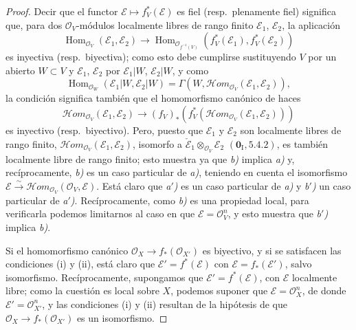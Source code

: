 \begin{proof}
Decir que el functor $\mathscr E\mapsto f_V^*(\mathscr E)$ es fiel
(resp.\ plenamente fiel) significa que, para dos $\mathcal O_V$-módulos localmente
libres de rango finito $\mathscr E_1$, $\mathscr E_2$, la aplicación
\[
  \operatorname{Hom}_{\mathcal O_V}(\mathscr E_1,\mathscr E_2)
  \longrightarrow
  \operatorname{Hom}_{\mathcal O_{f^{-1}(V)}}
  (f_V^*(\mathscr E_1),f_V^*(\mathscr E_2))
\]
es inyectiva (resp.\ biyectiva); como esto debe cumplirse sustituyendo $V$ por un
abierto $W\subset V$ y $\mathscr E_1$, $\mathscr E_2$ por $\mathscr E_1|W$,
$\mathscr E_2|W$, y como
\[
  \operatorname{Hom}_{\mathcal O_W}(\mathscr E_1|W,\mathscr E_2|W)
  =\Gamma(W,\mathscr Hom_{\mathcal O_V}(\mathscr E_1,\mathscr E_2)),
\]
la condición significa también que el homomorfismo canónico de haces
\[
\label{IV.21.13.2.1}
  \mathscr Hom_{\mathcal O_V}(\mathscr E_1,\mathscr E_2)
  \longrightarrow
  (f_V)_*(f_V^*(\mathscr Hom_{\mathcal O_V}(\mathscr E_1,\mathscr E_2)))
  \tag{21.13.2.1}
\]
es inyectivo (resp.\ biyectivo). Pero, puesto que $\mathscr E_1$ y $\mathscr E_2$ son
localmente libres de rango finito,
$\mathscr Hom_{\mathcal O_V}(\mathscr E_1,\mathscr E_2)$, isomorfo a
$\check{\mathscr E}_1\otimes_{\mathcal O_V}\mathscr E_2$
$(\mathbf 0_{\mathrm I}, 5.4.2)$, es también localmente libre de rango finito; esto muestra
ya que \emph{b)} implica \emph{a)} y, recíprocamente, \emph{b)} es un caso particular de \emph{a)},
teniendo en cuenta el isomorfismo
$\mathscr E\xrightarrow{\sim}\mathscr Hom_{\mathcal O_V}(\mathcal O_V,\mathscr E)$.
Está claro que \emph{a$'$)} es un caso particular de \emph{a)} y \emph{b$'$)} un caso particular de
\emph{a$'$)}. Recíprocamente, como \emph{b)} es una propiedad local, para verificarla podemos
limitarnos al caso en que $\mathscr E=\mathcal O_V^n$, y esto muestra que \emph{b$'$)} implica
\emph{b)}.

Si el homomorfismo canónico $\mathcal O_X\to f_*(\mathcal O_{X'})$ es biyectivo,
y si se satisfacen las condiciones (i) y (ii), está claro que
$\mathscr E'=f^*(\mathscr E)$ con $\mathscr E=f_*(\mathscr E')$, salvo isomorfismo.
Recíprocamente, supongamos que $\mathscr E'=f^*(\mathscr E)$, con $\mathscr E$ localmente
libre; como la cuestión es local sobre $X$, podemos suponer que
$\mathscr E=\mathcal O_X^n$, de donde $\mathscr E'=\mathcal O_{X'}^n$, y las condiciones
(i) y (ii) resultan de la hipótesis de que
$\mathcal O_X\to f_*(\mathcal O_{X'})$ es un isomorfismo.
\end{proof}

